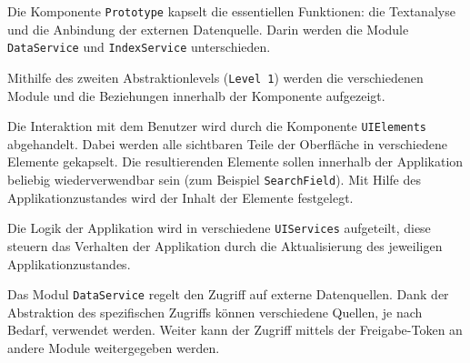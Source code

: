 


Die Komponente \texttt{Prototype} kapselt die essentiellen Funktionen: die Textanalyse und die Anbindung der externen Datenquelle. Darin werden die Module \texttt{DataService} und \texttt{IndexService} unterschieden. 





Mithilfe des zweiten Abstraktionlevels (\texttt{Level 1}) werden die verschiedenen Module und die Beziehungen innerhalb der Komponente aufgezeigt. 





Die Interaktion mit dem Benutzer wird durch die Komponente \texttt{UI\-Ele\-ments} abgehandelt. Dabei werden alle sichtbaren Teile der Oberfläche in verschiedene Elemente gekapselt. Die resultierenden Elemente sollen innerhalb der Applikation beliebig wiederverwendbar sein (zum Beispiel \texttt{SearchField}). Mit Hilfe des Applikationzustandes wird der Inhalt der Elemente festgelegt.





Die Logik der Applikation wird in verschiedene \texttt{UIServices} aufgeteilt, diese steuern das Verhalten der Applikation durch die Aktualisierung des jeweiligen Applikationzustandes.





Das Modul \texttt{DataService} regelt den Zugriff auf externe Datenquellen. Dank der Abstraktion des spezifischen Zugriffs können verschiedene Quellen, je nach Bedarf, verwendet werden. Weiter kann der Zugriff mittels der Freigabe-Token an andere Module weitergegeben werden. %

